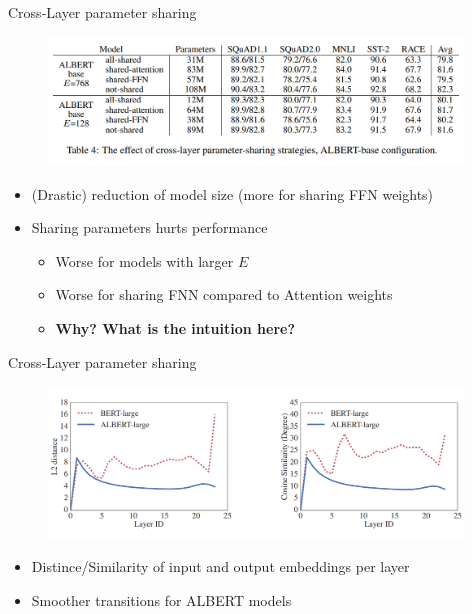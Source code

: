 \begin{frame}{Cross-Layer parameter sharing}

\vfill

	\begin{figure}
		\centering
		\includegraphics[width = 11cm]{figure/albert-param-sharing.png}\\ 
	\end{figure}

	\begin{itemize}
		\item (Drastic) reduction of model size (more for sharing FFN weights)
		\item Sharing parameters hurts performance
			\begin{itemize}
				\item Worse for models with larger $E$
				\item Worse for sharing FNN compared to Attention weights
		\item \ques \textbf{Why? What is the intuition here?}
			\end{itemize}
	\end{itemize}


\vfill

\end{frame}


\begin{frame}{Cross-Layer parameter sharing}

\vfill

	\begin{figure}
		\centering
		\includegraphics[width = 11cm]{figure/albert-param-sharing2.png}\\ 
	\end{figure}
	
\begin{itemize}
	\item Distince/Similarity of input and output embeddings per layer
	\item Smoother transitions for ALBERT models
\end{itemize}

\vfill

\end{frame}

